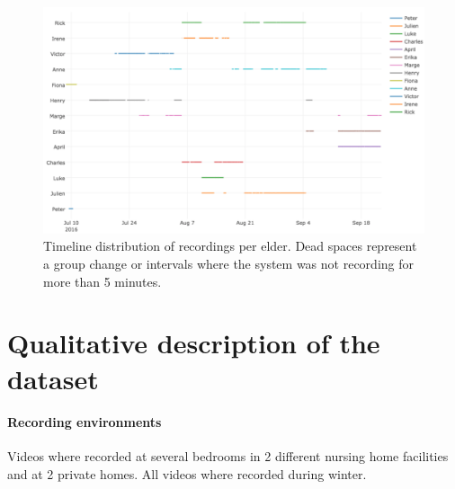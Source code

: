 \documentclass[oneside, twocolumn]{article}
\begin{document}
\begin{figure}
  \centering
    \includegraphics[width=1.0\textwidth]{images/recording_timeline (1).png}
  \caption{Timeline distribution of recordings per elder. Dead spaces represent a group change or intervals where the system was not recording for more than 5 minutes.}
  \label{fig:timeline}
\end{figure}


\section{Qualitative description of the dataset}
\label{sec:properties}
\paragraph{Recording environments}
Videos where recorded at several bedrooms in 2 different nursing home facilities and at 2 private homes. All videos where recorded during winter.
\end{document}
